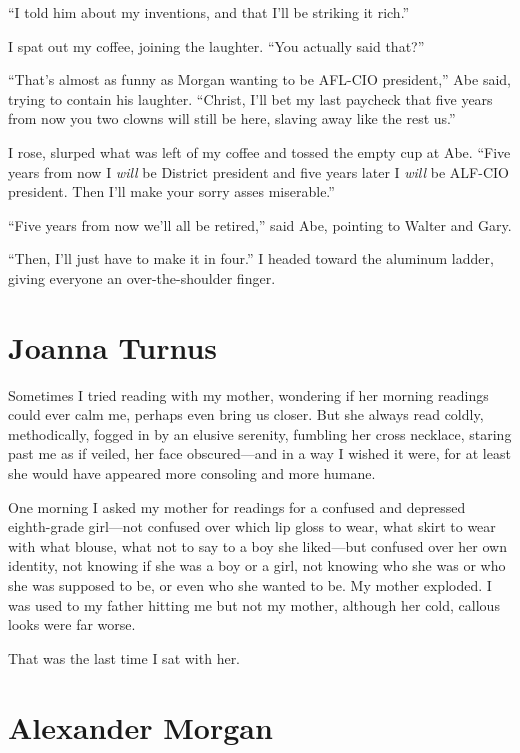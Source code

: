 ``I told him about my inventions, and that I'll be striking it rich.''

I spat out my coffee, joining the laughter. ``You actually said that?''

``That's almost as funny as Morgan wanting to be AFL-CIO president,''
Abe said, trying to contain his laughter. ``Christ, I'll bet my last
paycheck that five years from now you two clowns will still be here,
slaving away like the rest us.''

I rose, slurped what was left of my coffee and tossed the empty cup at
Abe. ``Five years from now I \emph{will} be District president and five
years later I \emph{will} be ALF-CIO president. Then I'll make your
sorry asses miserable.''

``Five years from now we'll all be retired,'' said Abe, pointing to
Walter and Gary.

``Then, I'll just have to make it in four.'' I headed toward the
aluminum ladder, giving everyone an over-the-shoulder finger.

\chapter{Joanna Turnus}

\titlemark

Sometimes I tried reading with my mother, wondering if her morning
readings could ever calm me, perhaps even bring us closer. But she
always read coldly, methodically, fogged in by an elusive serenity,
fumbling her cross necklace, staring past me as if veiled, her face
obscured---and in a way I wished it were, for at least she would have
appeared more consoling and more humane.

One morning I asked my mother for readings for a confused and depressed
eighth-grade girl---not confused over which lip gloss to wear, what
skirt to wear with what blouse, what not to say to a boy she liked---but
confused over her own identity, not knowing if she was a boy or a girl,
not knowing who she was or who she was supposed to be, or even who she
wanted to be. My mother exploded. I was used to my father hitting me but
not my mother, although her cold, callous looks were far worse.

That was the last time I sat with her.

\chapter{Alexander Morgan}

